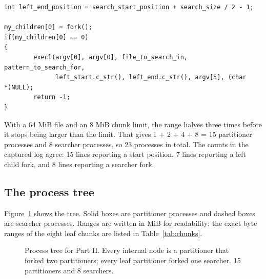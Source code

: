 \documentclass[11pt]{article}
\begin{document}
\begin{lstlisting}
int left_end_position = search_start_position + search_size / 2 - 1;

my_children[0] = fork();
if(my_children[0] == 0)
{
        execl(argv[0], argv[0], file_to_search_in, pattern_to_search_for,
              left_start.c_str(), left_end.c_str(), argv[5], (char *)NULL);
        return -1;
}
\end{lstlisting}

With a 64 MiB file and an 8 MiB chunk limit, the range halves three times before it
stops being larger than the limit. That gives 1 + 2 + 4 + 8 = 15 partitioner
processes and 8 searcher processes, so 23 processes in total. The counts in the
captured log agree: 15 lines reporting a start position, 7 lines reporting a left
child fork, and 8 lines reporting a searcher fork.

\subsection*{The process tree}

Figure~\ref{fig:tree} shows the tree. Solid boxes are partitioner processes and
dashed boxes are searcher processes. Ranges are written in MiB for readability; the
exact byte ranges of the eight leaf chunks are listed in Table~\ref{tab:chunks}.

\begin{figure}[h]
\centering
{}
\caption{Process tree for Part II. Every internal node is a partitioner that forked
two partitioners; every leaf partitioner forked one searcher. 15 partitioners and 8
searchers.}
\label{fig:tree}
\end{figure}
\end{document}
